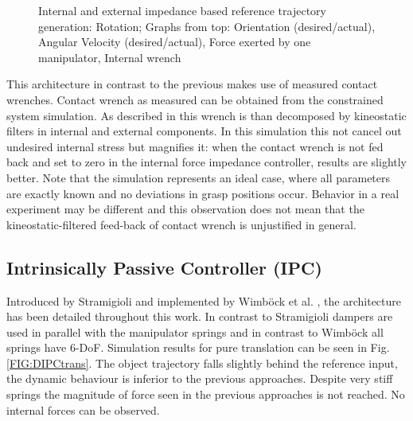 \documentclass[a4paper,twoside, openright,12pt]{report}
\begin{document}
\begin{figure}[t]
\caption[Internal and external impedance based reference trajectory generation: Rotation]{Internal and external impedance based reference trajectory generation: Rotation; Graphs from top: Orientation (desired/actual), Angular Velocity (desired/actual), Force exerted by one manipulator, Internal wrench}
\label{FIG:abb4}
\end{figure}


This architecture in contrast to the previous makes use of measured contact wrenches. Contact wrench as measured can be obtained from the constrained system simulation. As described in \cite{CoopManipHandbook} this wrench is than decomposed by kineostatic filters in internal and external components. In this simulation this not cancel out undesired internal stress but magnifies it: when the contact wrench is not fed back and set to zero in the internal force impedance controller, results are slightly better. Note that the simulation represents an ideal case, where all parameters are exactly known and no deviations in grasp positions occur. Behavior in a real experiment may be different and this observation does not mean that the kineostatic-filtered feed-back of contact wrench is unjustified in general.



\subsection{Intrinsically Passive Controller (IPC)}
Introduced by Stramigioli \cite{Stramigioli_01} and implemented by Wimb\"ock et al. \cite{Wimboeck_08}, the architecture has been detailed throughout this work. In contrast to Stramigioli dampers are used in parallel with the manipulator springs and in contrast to Wimb\"ock all springs have 6-DoF. Simulation results for pure translation can be seen in Fig. \ref{FIG:DIPCtrans}. The object trajectory falls slightly behind the reference input, the dynamic behaviour is inferior to the previous approaches. Despite very stiff springs the magnitude of force seen in the previous approaches is not reached. No internal forces can be observed.
\end{document}
